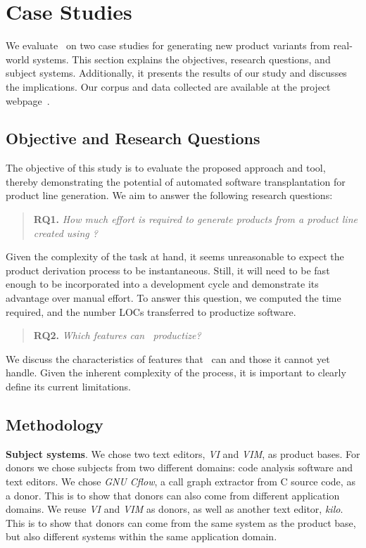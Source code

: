 \section{Case Studies} \label{sec:case_studies}
We evaluate \prodscalpel~on two case studies for generating new product variants from real-world systems. This section explains the objectives, research questions, and subject systems. Additionally, it presents the results of our study and discusses the implications. Our corpus and data collected are available at the project webpage~\cite{ProjectWebpage}.

\subsection{Objective and Research Questions}
The objective of this study is to evaluate the proposed approach and tool, thereby demonstrating the potential of automated software transplantation for product line generation. %
We aim to answer the following research questions:

\begin{quote}
\textbf{RQ1.} \emph{How much effort is required to generate products from a product line created using \prodscalpel?}
\end{quote}
Given the complexity of the task at hand, it seems unreasonable to expect the product derivation process to be instantaneous. Still, it will need to be fast enough to be incorporated into a development cycle and demonstrate its advantage over manual effort. To answer this question, we computed the time required, and the number LOCs transferred to productize software.

\begin{quote}
\textbf{RQ2.} \emph{Which features can \prodscalpel~productize?}
\end{quote}
We discuss the characteristics of features that \prodscalpel~can and those it cannot yet handle. Given the inherent complexity of the process, it is important to clearly define its current limitations. 

\subsection{Methodology}

\textbf{Subject systems}. We chose two text editors, \emph{VI} and \emph{VIM}, as product bases.
For donors we chose subjects from two different domains: code analysis software and text editors.
We chose \emph{GNU Cflow}, a call graph extractor from C source code, as a donor.
This is to show that donors can also come from different application domains.
We reuse \emph{VI} and \emph{VIM} as donors, as well as another text editor, \emph{kilo}.
This is to show that donors can come from the same system as the product base, but also different systems within the same application domain.

